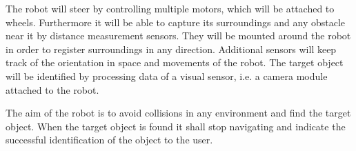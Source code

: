 The robot will steer by controlling multiple motors, which will be attached to wheels. Furthermore it will be able to capture its surroundings and any obstacle near it by distance measurement sensors. They will be mounted around the robot in order to register surroundings in any direction. Additional sensors will keep track of the orientation in space and movements of the robot. The target object will be identified by processing data of a visual sensor, i.e. a camera module attached to the robot.

The aim of the robot is to avoid collisions in any environment and find the target object. When the target object is found it shall stop navigating and indicate the successful identification of the object to the user.




